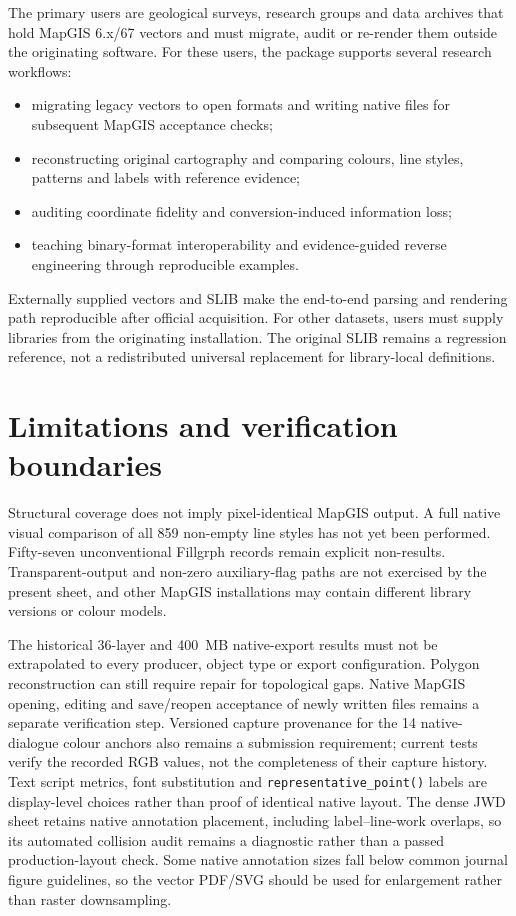 \documentclass[preprint,12pt,numbers]{elsarticle}
\begin{document}
The primary users are geological surveys, research groups and data archives that hold MapGIS 6.x/67 vectors and must migrate, audit or re-render them outside the originating software. For these users, the package supports several research workflows:
\begin{itemize}
  \item migrating legacy vectors to open formats and writing native files for subsequent MapGIS acceptance checks;
  \item reconstructing original cartography and comparing colours, line styles, patterns and labels with reference evidence;
  \item auditing coordinate fidelity and conversion-induced information loss;
  \item teaching binary-format interoperability and evidence-guided reverse engineering through reproducible examples.
\end{itemize}

Externally supplied vectors and SLIB make the end-to-end parsing and rendering path reproducible after official acquisition. For other datasets, users must supply libraries from the originating installation. The original SLIB remains a regression reference, not a redistributed universal replacement for library-local definitions.

\section{Limitations and verification boundaries}

Structural coverage does not imply pixel-identical MapGIS output. A full native visual comparison of all 859 non-empty line styles has not yet been performed. Fifty-seven unconventional Fillgrph records remain explicit non-results. Transparent-output and non-zero auxiliary-flag paths are not exercised by the present sheet, and other MapGIS installations may contain different library versions or colour models.

The historical 36-layer and 400~MB native-export results must not be extrapolated to every producer, object type or export configuration. Polygon reconstruction can still require repair for topological gaps. Native MapGIS opening, editing and save/reopen acceptance of newly written files remains a separate verification step. Versioned capture provenance for the 14 native-dialogue colour anchors also remains a submission requirement; current tests verify the recorded RGB values, not the completeness of their capture history. Text script metrics, font substitution and \texttt{representative\_point()} labels are display-level choices rather than proof of identical native layout. The dense JWD sheet retains native annotation placement, including label--line-work overlaps, so its automated collision audit remains a diagnostic rather than a passed production-layout check. Some native annotation sizes fall below common journal figure guidelines, so the vector PDF/SVG should be used for enlargement rather than raster downsampling.
\end{document}
